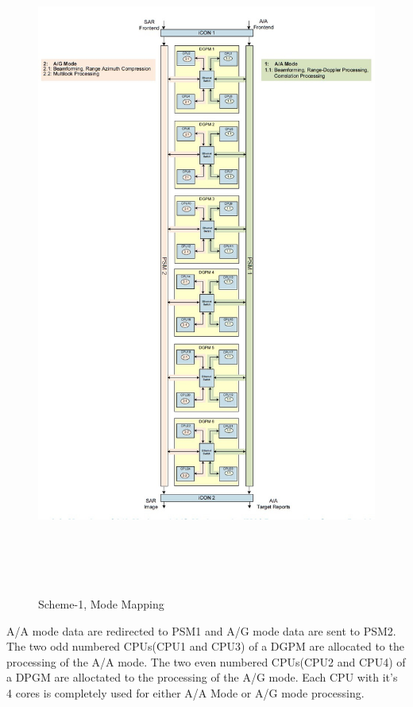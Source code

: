 \begin{figure}[h!]
	\centering
	\includegraphics[width=160mm, height=220mm]{figures/scheme1}
	\caption{ Scheme-1, Mode Mapping}
	\label{fig:existing_analysis:scheme1}
\end{figure}
\FloatBarrier

A/A mode data are redirected to PSM1 and A/G mode data are sent to PSM2. The two odd numbered CPUs(CPU1 and CPU3) of a  DGPM are allocated to the processing of the A/A mode. The two even numbered CPUs(CPU2 and CPU4)  of a DPGM are alloctated to the processing of the A/G mode. Each CPU with it's 4 cores is completely used for either A/A Mode or A/G mode processing.

